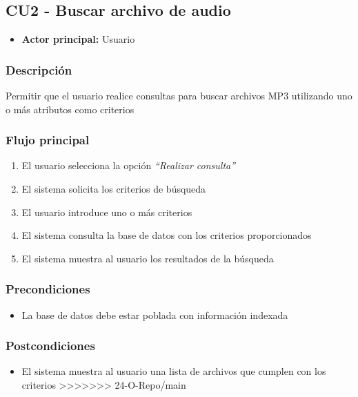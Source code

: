 
\bigskip

\subsection*{CU2 - Buscar archivo de audio}
\begin{itemize}
  \item \textbf{Actor principal:} Usuario
\end{itemize}

\subsubsection*{Descripción}
Permitir que el usuario realice consultas para buscar archivos MP3 utilizando uno o más
atributos como criterios

\subsubsection*{Flujo principal}
\begin{enumerate}
  \item El usuario selecciona la opción \textit{\textquotedblleft Realizar consulta\textquotedblright}
  \item El sistema solicita los criterios de búsqueda
  \item El usuario introduce uno o más criterios
  \item El sistema consulta la base de datos con los criterios proporcionados
  \item El sistema muestra al usuario los resultados de la búsqueda
\end{enumerate}

\subsubsection*{Precondiciones}
\begin{itemize}
  \item La base de datos debe estar poblada con información indexada
\end{itemize}

\subsubsection*{Postcondiciones}
\begin{itemize}
  \item El sistema muestra al usuario una lista de archivos que cumplen con los criterios
>>>>>>> 24-O-Repo/main
\end{itemize}